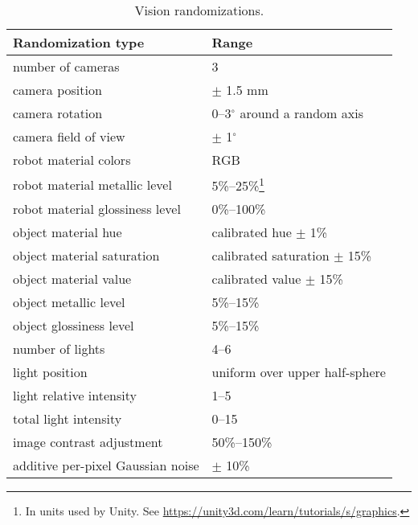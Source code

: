 \begin{savenotes}
\begin{table}
    \footnotesize
    \centering
    \caption{Vision randomizations.}
    \renewcommand{\arraystretch}{1.3}
    \begin{tabular}{@{}ll@{}}
        \toprule
        \textbf{Randomization type} & \textbf{Range} \\ \midrule
        number of cameras & 3 \\
        camera position & $\pm$ 1.5 mm \\
        camera rotation & 0--3$^{\circ}$ around a random axis \\
        camera field of view & $\pm$ 1$^{\circ}$ \\
        \hline
        robot material colors & RGB \\
        robot material metallic level & 5\%--25\%\footnote{In units used by Unity. See \url{https://unity3d.com/learn/tutorials/s/graphics}.} \\
        robot material glossiness level & 0\%--100\%\footnotemark[\value{footnote}] \\
        \hline
        object material hue & calibrated hue $\pm$ 1\% \\
        object material saturation & calibrated saturation $\pm$ 15\% \\
        object material value & calibrated value $\pm$ 15\% \\
        object metallic level & 5\%--15\%\footnotemark[\value{footnote}] \\
        object glossiness level & 5\%--15\%\footnotemark[\value{footnote}] \\
        \hline
        number of lights & 4--6 \\
        light position & uniform over upper half-sphere \\
        light relative intensity & 1--5 \\
        total light intensity & 0--15\footnotemark[\value{footnote}] \\
        \hline
        image contrast adjustment & 50\%--150\% \\
        additive per-pixel Gaussian noise & $\pm$ 10\% \\
        \bottomrule
    \end{tabular}
\label{table:vision-randomization}
\end{table}
\end{savenotes}

    